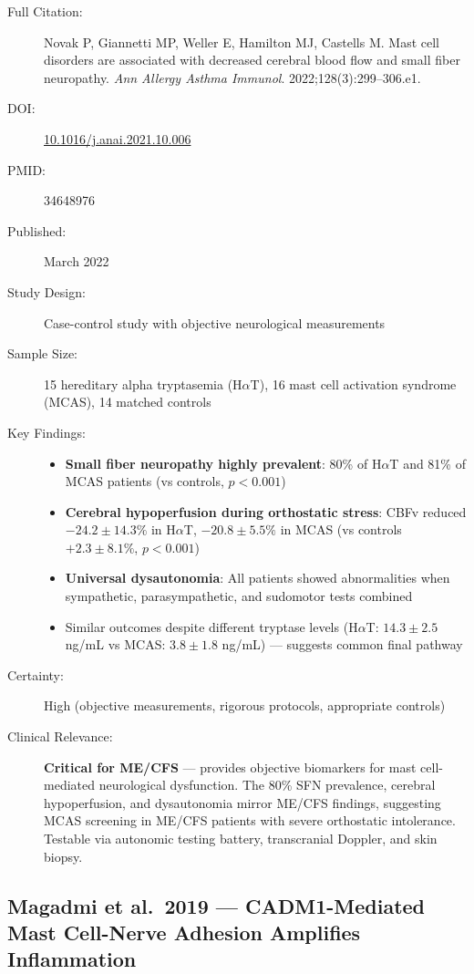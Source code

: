 \begin{description}
    \item[Full Citation:] Novak P, Giannetti MP, Weller E, Hamilton MJ, Castells M. Mast cell disorders are associated with decreased cerebral blood flow and small fiber neuropathy. \textit{Ann Allergy Asthma Immunol}. 2022;128(3):299--306.e1.
    \item[DOI:] \href{https://doi.org/10.1016/j.anai.2021.10.006}{10.1016/j.anai.2021.10.006}
    \item[PMID:] 34648976
    \item[Published:] March 2022
    \item[Study Design:] Case-control study with objective neurological measurements
    \item[Sample Size:] 15 hereditary alpha tryptasemia (H$\alpha$T), 16 mast cell activation syndrome (MCAS), 14 matched controls
    \item[Key Findings:]
    \begin{itemize}
        \item \textbf{Small fiber neuropathy highly prevalent}: 80\% of H$\alpha$T and 81\% of MCAS patients (vs controls, $p<0.001$)
        \item \textbf{Cerebral hypoperfusion during orthostatic stress}: CBFv reduced $-24.2\pm14.3\%$ in H$\alpha$T, $-20.8\pm5.5\%$ in MCAS (vs controls $+2.3\pm8.1\%$, $p<0.001$)
        \item \textbf{Universal dysautonomia}: All patients showed abnormalities when sympathetic, parasympathetic, and sudomotor tests combined
        \item Similar outcomes despite different tryptase levels (H$\alpha$T: $14.3\pm2.5$ ng/mL vs MCAS: $3.8\pm1.8$ ng/mL) --- suggests common final pathway
    \end{itemize}
    \item[Certainty:] High (objective measurements, rigorous protocols, appropriate controls)
    \item[Clinical Relevance:] \textbf{Critical for ME/CFS} --- provides objective biomarkers for mast cell-mediated neurological dysfunction. The 80\% SFN prevalence, cerebral hypoperfusion, and dysautonomia mirror ME/CFS findings, suggesting MCAS screening in ME/CFS patients with severe orthostatic intolerance. Testable via autonomic testing battery, transcranial Doppler, and skin biopsy.
\end{description}

\subsection{Magadmi et al.\ 2019 --- CADM1-Mediated Mast Cell-Nerve Adhesion Amplifies Inflammation}

